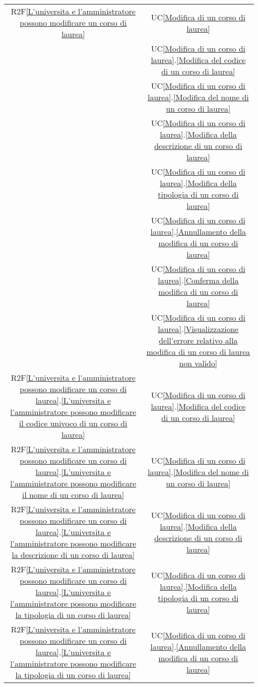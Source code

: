 \begin{longtable}{|c|c|}
\hline
R2F\ref{L'universita e l'amministratore possono modificare un corso di laurea} & UC\ref{Modifica di un corso di laurea}\\
& UC\ref{Modifica di un corso di laurea}.\ref{Modifica del codice di un corso di laurea}\\
& UC\ref{Modifica di un corso di laurea}.\ref{Modifica del nome di un corso di laurea}\\
& UC\ref{Modifica di un corso di laurea}.\ref{Modifica della descrizione di un corso di laurea}\\
& UC\ref{Modifica di un corso di laurea}.\ref{Modifica della tipologia di un corso di laurea}\\
& UC\ref{Modifica di un corso di laurea}.\ref{Annullamento della modifica di un corso di laurea}\\
& UC\ref{Modifica di un corso di laurea}.\ref{Conferma della modifica di un corso di laurea}\\
& UC\ref{Modifica di un corso di laurea}.\ref{Visualizzazione dell'errore relativo alla modifica di un corso di laurea non valido}\\
\hline
R2F\ref{L'universita e l'amministratore possono modificare un corso di laurea}.\ref{L'universita e l'amministratore possono modificare il codice univoco di un corso di laurea} & UC\ref{Modifica di un corso di laurea}.\ref{Modifica del codice di un corso di laurea}\\
\hline
R2F\ref{L'universita e l'amministratore possono modificare un corso di laurea}.\ref{L'universita e l'amministratore possono modificare il nome di un corso di laurea} & UC\ref{Modifica di un corso di laurea}.\ref{Modifica del nome di un corso di laurea}\\
\hline
R2F\ref{L'universita e l'amministratore possono modificare un corso di laurea}.\ref{L'universita e l'amministratore possono modificare la descrizione di un corso di laurea} & UC\ref{Modifica di un corso di laurea}.\ref{Modifica della descrizione di un corso di laurea}\\
\hline
R2F\ref{L'universita e l'amministratore possono modificare un corso di laurea}.\ref{L'universita e l'amministratore possono modificare la tipologia di un corso di laurea} & UC\ref{Modifica di un corso di laurea}.\ref{Modifica della tipologia di un corso di laurea}\\
\hline
R2F\ref{L'universita e l'amministratore possono modificare un corso di laurea}.\ref{L'universita e l'amministratore possono modificare la tipologia di un corso di laurea} & UC\ref{Modifica di un corso di laurea}.\ref{Annullamento della modifica di un corso di laurea}\\

\end{longtable}
